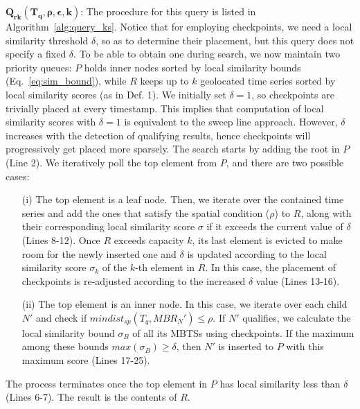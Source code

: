 \vspace{2mm}

\noindent $\mathbold{Q_{rk}(T_q, \rho, \epsilon, k)}$: The procedure for this query is listed in Algorithm~\ref{alg:query_ks}. Notice that for employing checkpoints, we need a local similarity threshold $\delta$, so as to determine their placement, but this query does not specify a fixed $\delta$. To be able to obtain one during search, we now maintain two priority queues: $P$ holds inner nodes sorted by local similarity bounds (Eq.~\ref{eq:sim_bound}), while $R$ keeps up to $k$ geolocated time series sorted by local similarity scores (as in Def. 1). We initially set $\delta=1$, so checkpoints are trivially placed at every timestamp. This implies that computation of local similarity scores with $\delta=1$ is equivalent to the sweep line approach. However, $\delta$ increases with the detection of qualifying results, hence checkpoints will progressively get placed more sparsely. The search starts by adding the \btsr root in $P$ (Line 2). We iteratively poll the top element from $P$, and there are two possible cases:
\begin{enumerate}
\item[(i)] The top element is a leaf node. Then, we iterate over the contained time series and add the ones that satisfy the spatial condition ($\rho$) to $R$, along with their corresponding local similarity score $\sigma$ if it exceeds the current value of $\delta$ (Lines 8-12).
Once $R$ exceeds capacity $k$, its last element is evicted to make room for the newly inserted one and $\delta$ is updated according to the local similarity score $\sigma_k$ of the $k$-th element in $R$. In this case, the placement of checkpoints is re-adjusted according to the increased $\delta$ value (Lines 13-16).

\item[(ii)] The top element is an inner node. In this case, we iterate over each child $N'$ and check if $mindist_{sp}(T_q, {MBR_N'}) \leq \rho$. If $N'$ qualifies, we calculate the local similarity bound $\sigma_B$ of all its MBTSs using checkpoints. If the maximum among these bounds $max(\sigma_B) \geq \delta$, then $N'$ is inserted to $P$ with this maximum score (Lines 17-25).
\end{enumerate}

The process terminates once the top element in $P$ has local similarity less than $\delta$ (Lines 6-7). The result is the contents of $R$.


